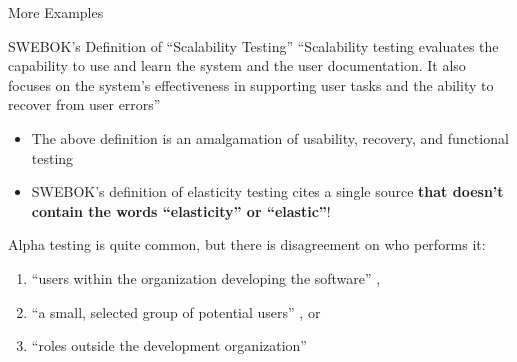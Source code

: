 \documentclass[22pt]{beamer}
\begin{document}
\begin{frame}[fragile]
\begin{textblock}{7.25}
\begin{block}{\fontsize{37}{20}\selectfont More Examples}
            \quad\\ %

            \begin{center}
                \begin{minipage}{.9\textwidth}
                    \begin{exampleblock}{SWEBOK's Definition of ``Scalability Testing''}
                        {\fontsize{28}{13}\selectfont
                            ``Scalability testing evaluates the capability to
                            use and learn the system and the user documentation.
                            It also focuses on the system's effectiveness in
                            supporting user tasks and the ability to recover
                            from user errors'' \cite[p.~5-9]{SWEBOK2024}}
                    \end{exampleblock}
                \end{minipage}
            \end{center}

            \begin{itemize}
                \item The above definition is an amalgamation of usability,
                      recovery, and functional testing
                \item SWEBOK's definition
                      of elasticity testing cites a single source \cite[p.~5-9]{SWEBOK2024}
                      \textbf{that doesn't contain the words ``elasticity'' or ``elastic''}!
            \end{itemize}

            \vspace{5mm}

            Alpha testing is quite common, but there is disagreement on who
            performs it:
            \begin{enumerate}
                \item ``users within the organization developing the software''
                      \cite[p.~17]{IEEE2017},
                \item ``a small, selected group of potential users''
                      \cite[p.~5-8]{SWEBOK2024}, or
                \item ``roles outside the development organization''
                      \cite{ISTQB_poster}
            \end{enumerate}
            \vspace{5mm}
        \end{block}


\end{textblock}
\end{frame}
\end{document}
